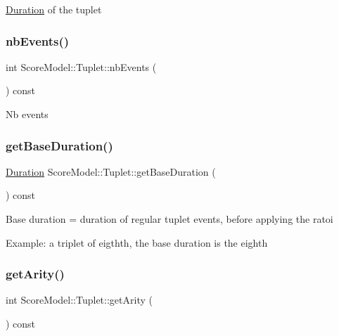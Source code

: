 \mbox{\hyperlink{classScoreModel_1_1Duration}{Duration}} of the tuplet \mbox{\label{classScoreModel_1_1Tuplet_af1c41eda48b4f7ad792bd01bfbda8a58}} 
\subsubsection{\texorpdfstring{nbEvents()}{nbEvents()}}
{\footnotesize\ttfamily int Score\+Model\+::\+Tuplet\+::nb\+Events (\begin{DoxyParamCaption}{ }\end{DoxyParamCaption}) const}

Nb events \mbox{\label{classScoreModel_1_1Tuplet_ad638693da54a63af98d2532163fd7d62}} 
\subsubsection{\texorpdfstring{getBaseDuration()}{getBaseDuration()}}
{\footnotesize\ttfamily \mbox{\hyperlink{classScoreModel_1_1Duration}{Duration}} Score\+Model\+::\+Tuplet\+::get\+Base\+Duration (\begin{DoxyParamCaption}{ }\end{DoxyParamCaption}) const}

Base duration = duration of regular tuplet events, before applying the ratoi

Example\+: a triplet of eigthth, the base duration is the eighth \mbox{\label{classScoreModel_1_1Tuplet_a994676b3ff11c59784db05233d3a3134}} 
\subsubsection{\texorpdfstring{getArity()}{getArity()}}
{\footnotesize\ttfamily int Score\+Model\+::\+Tuplet\+::get\+Arity (\begin{DoxyParamCaption}{ }\end{DoxyParamCaption}) const}

